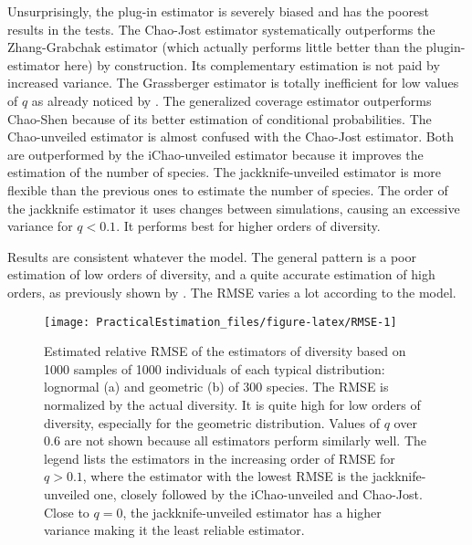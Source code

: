 \documentclass[fleqn,10pt]{latex/stylish_article} %
\begin{document}
Unsurprisingly, the plug-in estimator is severely biased and has the poorest results in the tests.
The Chao-Jost estimator systematically outperforms the Zhang-Grabchak estimator (which actually performs little better than the plugin-estimator here) by construction.
Its complementary estimation is not paid by increased variance.
The Grassberger estimator is totally inefficient for low values of \(q\) as already noticed by \citet{Marcon2014a}.
The generalized coverage estimator outperforms Chao-Shen because of its better estimation of conditional probabilities.
The Chao-unveiled estimator is almost confused with the Chao-Jost estimator.
Both are outperformed by the iChao-unveiled estimator because it improves the estimation of the number of species.
The jackknife-unveiled estimator is more flexible than the previous ones to estimate the number of species.
The order of the jackknife estimator it uses changes between simulations, causing an excessive variance for \(q<0.1\).
It performs best for higher orders of diversity.

Results are consistent whatever the model.
The general pattern is a poor estimation of low orders of diversity, and a quite accurate estimation of high orders, as previously shown by \citet{Haegeman2013}.
The RMSE varies a lot according to the model.



\scriptsize

\begin{figure*}

{\centering \texttt{[image: PracticalEstimation\_files/figure-latex/RMSE-1]} 

}

\caption{Estimated relative RMSE of the estimators of diversity based on 1000 samples of 1000 individuals of each typical distribution: lognormal (a) and geometric (b) of 300 species. The RMSE is normalized by the actual diversity. It is quite high for low orders of diversity, especially for the geometric distribution. Values of \(q\) over 0.6 are not shown because all estimators perform similarly well. The legend lists the estimators in the increasing order of RMSE for \(q>0.1\), where the estimator with the lowest RMSE is the jackknife-unveiled one, closely followed by the iChao-unveiled and Chao-Jost. Close to \(q=0\), the jackknife-unveiled estimator has a higher variance making it the least reliable estimator.}\label{fig:RMSE}
\end{figure*}

\normalsize
\end{document}
